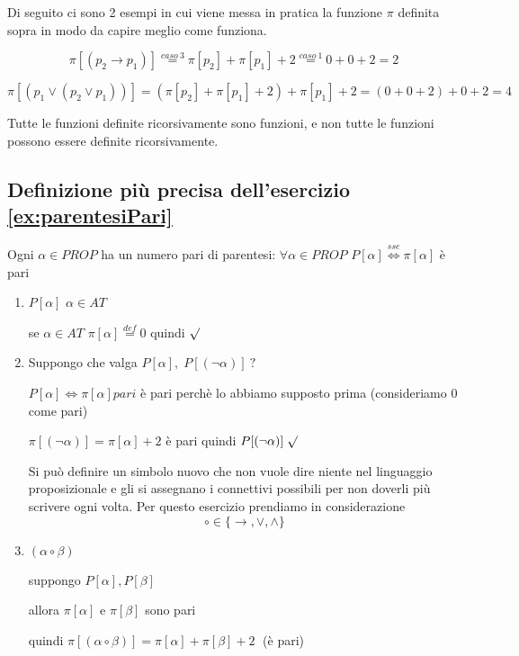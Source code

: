 \documentclass{article}
\theoremstyle{break}
\theoremstyle{break}
\theoremstyle{break}
\theoremstyle{break}
\begin{document}
Di seguito ci sono 2 esempi in cui viene messa in pratica la funzione \( \pi \) definita sopra in
modo da capire meglio come funziona.

\begin{example}
	\[
		\pi[(p_{2}\to p_{1})]\stackrel{caso \:3}{=}\pi[p_{2}]+\pi[p_{1}]+2\stackrel{caso \:1}{=}0+0+2=2
	\]
\end{example}
\begin{example}
	\[
		\pi[(p_{1}\vee (p_{2}\vee p_{1}))] = (\pi[p_{2}] + \pi[p_{1}] + 2) + \pi[p_{1}] + 2 = (0 + 0 + 2) + 0 + 2 = 4
	\]
\end{example}

Tutte le funzioni definite ricorsivamente sono funzioni, e non tutte le funzioni possono essere definite ricorsivamente.

\subsection{Definizione più precisa dell'esercizio \ref{ex:parentesiPari}}
Ogni \( \alpha \in PROP \) ha un numero pari di parentesi: \( \forall \alpha \in PROP \) \( P[\alpha] \stackrel{sse}{\Leftrightarrow} \pi[\alpha] \) è pari
\begin{enumerate}
	\item \( P[\alpha ] \) \( \alpha \in AT \)

	      se \( \alpha \in AT \! \) \( \pi[\alpha]\stackrel{def}{=}0 \) quindi \( \surd \)
	\item Suppongo che valga \( P[\alpha ],\; P[(\neg \alpha )] \: ? \)

	      \( P[\alpha ] \Leftrightarrow \pi[\alpha ] pari \) è pari perchè lo abbiamo supposto prima (consideriamo 0 come pari)


	      \( \pi[(\neg \alpha )] = \pi [\alpha ] + 2 \) è pari quindi \( P[(\neg \alpha )] \; \surd \)

	      Si può definire un simbolo nuovo che non vuole dire niente nel linguaggio proposizionale e
	      gli si assegnano i connettivi possibili per non doverli più scrivere ogni volta.
	      Per questo esercizio prendiamo in considerazione \[ \circ \in \{\to , \vee, \wedge\} \]

	\item \( (\alpha \circ \beta) \)

	      suppongo \( P[\alpha ], P[\beta ] \)

	      allora \( \pi[\alpha ] \) e \( \pi[\beta ] \) sono pari

	      quindi \( \pi[(\alpha \circ \beta )] = \pi[\alpha ] + \pi[\beta ] + 2 \;\) (è pari)

\end{enumerate}
\end{document}
